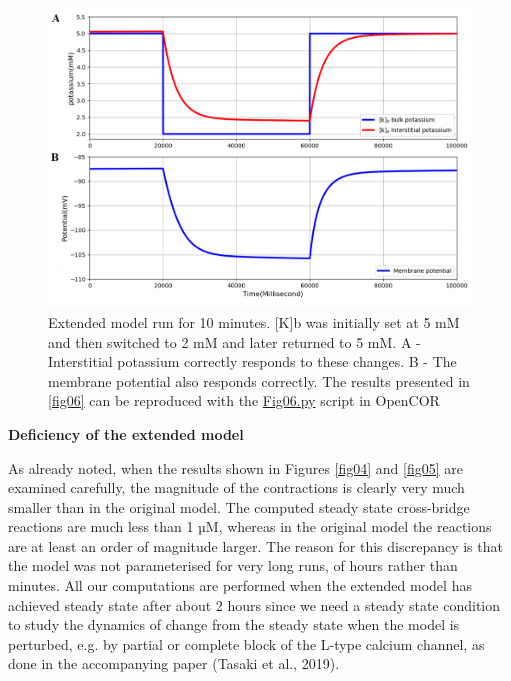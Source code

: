 \documentclass[fleqn,10pt]{physiome}
\begin{document}
\begin{figure}[ht]
\centering
\includegraphics[width=0.9\linewidth]{fig06}
\caption{Extended model run for 10 minutes. [K]b was initially set at 5 mM and then switched to 2 mM and later returned to 5 mM. A - Interstitial potassium correctly responds to these changes. B - The membrane potential also responds correctly. The results presented in \autoref{fig06} can be reproduced with the \href{https://models.physiomeproject.org/workspace/5c6/file/afd4d5cb20ecdcbc0b10198fe31795520488a34e/Fig06.py}{Fig06.py} script in OpenCOR} 
\label{fig06}
\end{figure}

\textbf{Deficiency of the extended model}\newline

As already noted, when the results shown in Figures \ref{fig04} and \ref{fig05} are examined carefully, the magnitude of the contractions is clearly very much smaller than in the original \citet{shorten2007mathematical} model. The computed steady state cross-bridge reactions are much less than 1 µM, whereas in the original model the reactions are at least an order of magnitude larger.  The reason for this discrepancy is that the model was not parameterised for very long runs, of hours rather than minutes. All our computations are performed when the extended model has achieved steady state after about 2 hours since we need a steady state condition to study the dynamics of change from the steady state when the model is perturbed, e.g. by partial or complete block of the L-type calcium channel, as done in the accompanying paper (Tasaki et al., 2019).
\end{document}
